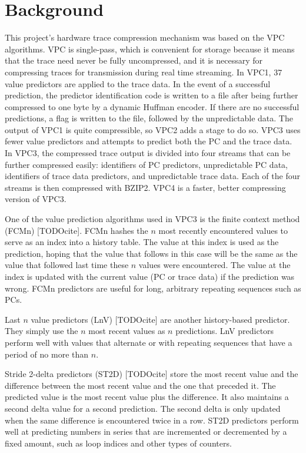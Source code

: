 \documentclass[conference]{IEEEtran}
\begin{document}
\section{Background}  
This project's hardware trace compression mechanism was based on the VPC algorithms. VPC is single-pass, which is convenient for storage because it means that the trace need never be fully uncompressed, and it is necessary for compressing traces for transmission during real time streaming. In VPC1, 37 value predictors are applied to the trace data. In the event of a successful prediction, the predictor identification code is written to a file after being further compressed to one byte by a dynamic Huffman encoder. If there are no successful predictions, a flag is written to the file, followed by the unpredictable data. The output of VPC1 is quite compressible, so VPC2 adds a stage to do so. VPC3 uses fewer value predictors and attempts to predict both the PC and the trace data. In VPC3, the compressed trace output is divided into four streams that can be further compressed easily: identifiers of PC predictors, unpredictable PC data, identifiers of trace data predictors, and unpredictable trace data. Each of the four streams is then compressed with BZIP2. VPC4 is a faster, better compressing version of VPC3.

One of the value prediction algorithms used in VPC3 is the finite context method (FCMn) [TODOcite]. FCMn hashes the $n$ most recently encountered values to serve as an index into a history table. The value at this index is used as the prediction, hoping that the value that follows in this case will be the same as the value that followed last time these $n$ values were encountered. The value at the index is updated with the current value (PC or trace data) if the prediction was wrong. FCMn predictors are useful for long, arbitrary repeating sequences such as PCs. 

Last $n$ value predictors (LnV) [TODOcite] are another history-based predictor. They simply use the $n$ most recent values as $n$ predictions. LnV predictors perform well with values that alternate or with repeating sequences that have a period of no more than $n$. 

Stride 2-delta predictors (ST2D) [TODOcite] store the most recent value and the difference between the most recent value and the one that preceded it. The predicted value is the most recent value plus the difference. It also maintains a second delta value for a second prediction. The second delta is only updated when the same difference is encountered twice in a row. ST2D predictors perform well at predicting numbers in series that are incremented or decremented by a fixed amount, such as loop indices and other types of counters. 
\end{document}
